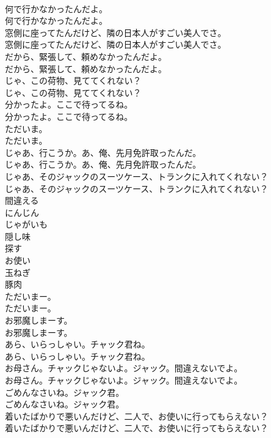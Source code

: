 \documentclass[8pt]{extreport}
\begin{document}
\begin{CJK}{UTF8}{min}
\\	何で行かなかったんだよ。	
\\	何で行かなかったんだよ。 
\\	窓側に座ってたんだけど、隣の日本人がすごい美人でさ。	
\\	窓側に座ってたんだけど、隣の日本人がすごい美人でさ。 
\\	だから、緊張して、頼めなかったんだよ。	
\\	だから、緊張して、頼めなかったんだよ。 
\\	じゃ、この荷物、見ててくれない？	
\\	じゃ、この荷物、見ててくれない？ 
\\	分かったよ。ここで待ってるね。	
\\	分かったよ。ここで待ってるね。 
\\	ただいま。	
\\	ただいま。 
\\	じゃあ、行こうか。あ、俺、先月免許取ったんだ。	
\\	じゃあ、行こうか。あ、俺、先月免許取ったんだ。 
\\	じゃあ、そのジャックのスーツケース、トランクに入れてくれない？	
\\	じゃあ、そのジャックのスーツケース、トランクに入れてくれない？ 
\\	間違える
\\	にんじん
\\	じゃがいも
\\	隠し味
\\	探す
\\	お使い
\\	玉ねぎ
\\	豚肉
\\	ただいまー。	
\\	ただいまー。 
\\	お邪魔しまーす。	
\\	お邪魔しまーす。 
\\	あら、いらっしゃい。チャック君ね。	
\\	あら、いらっしゃい。チャック君ね。 
\\	お母さん。チャックじゃないよ。ジャック。間違えないでよ。	
\\	お母さん。チャックじゃないよ。ジャック。間違えないでよ。 
\\	ごめんなさいね。ジャック君。	
\\	ごめんなさいね。ジャック君。 
\\	着いたばかりで悪いんだけど、二人で、お使いに行ってもらえない？	
\\	着いたばかりで悪いんだけど、二人で、お使いに行ってもらえない？ 

\end{CJK}
\end{document}
